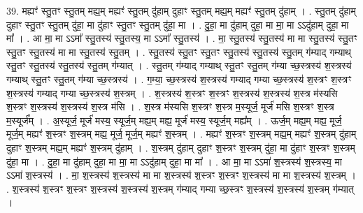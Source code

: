 \documentclass[17pt]{extarticle}
\begin{document}
39. मह्यꣳ॑ स्तु॒तꣳ स्तु॒तम् मह्य॒म् मह्यꣳ॑ स्तु॒तम् दु॑हाम् दुहाꣳ स्तु॒तम् मह्य॒म् मह्यꣳ॑ स्तु॒तम् दु॑हाम् । . स्तु॒तम् दु॑हाम् दुहाꣳ स्तु॒तꣳ स्तु॒तम् दु॑हा॒ मा दु॑हाꣳ स्तु॒तꣳ स्तु॒तम् दु॑हा॒ मा । . दु॒हा॒ मा दु॑हाम् दुहा॒ मा मा॒ मा ऽऽदु॑हाम् दुहा॒ मा मा᳚ । . आ मा॒ मा ऽऽमा᳚ स्तु॒तस्य॑ स्तु॒तस्य॒ मा ऽऽमा᳚ स्तु॒तस्य॑ । . मा॒ स्तु॒तस्य॑ स्तु॒तस्य॑ मा मा स्तु॒तस्य॑ स्तु॒तꣳ स्तु॒तꣳ स्तु॒तस्य॑ मा मा स्तु॒तस्य॑ स्तु॒तम् । . स्तु॒तस्य॑ स्तु॒तꣳ स्तु॒तꣳ स्तु॒तस्य॑ स्तु॒तस्य॑ स्तु॒तम् ग॑म्याद् गम्याथ् स्तु॒तꣳ स्तु॒तस्य॑ स्तु॒तस्य॑ स्तु॒तम् ग॑म्यात् । . स्तु॒तम् ग॑म्याद् गम्याथ् स्तु॒तꣳ स्तु॒तम् ग॑म्या च्छ॒स्त्रस्य॑ श॒स्त्रस्य॑ गम्याथ् स्तु॒तꣳ स्तु॒तम् ग॑म्या च्छ॒स्त्रस्य॑ । . ग॒म्या॒ च्छ॒स्त्रस्य॑ श॒स्त्रस्य॑ गम्याद् गम्या च्छ॒स्त्रस्य॑ श॒स्त्रꣳ श॒स्त्रꣳ श॒स्त्रस्य॑ गम्याद् गम्या च्छ॒स्त्रस्य॑ श॒स्त्रम् । . श॒स्त्रस्य॑ श॒स्त्रꣳ श॒स्त्रꣳ श॒स्त्रस्य॑ श॒स्त्रस्य॑ श॒स्त्र म॑स्यसि श॒स्त्रꣳ श॒स्त्रस्य॑ श॒स्त्रस्य॑ श॒स्त्र म॑सि । . श॒स्त्र म॑स्यसि श॒स्त्रꣳ श॒स्त्र म॒स्यूर्ज॒ मूर्ज॑ मसि श॒स्त्रꣳ श॒स्त्र म॒स्यूर्ज᳚म् । . अ॒स्यूर्ज॒ मूर्ज॑ मस्य॒ स्यूर्ज॒म् मह्य॒म् मह्य॒ मूर्ज॑ मस्य॒ स्यूर्ज॒म् मह्य᳚म् । . ऊर्ज॒म् मह्य॒म् मह्य॒ मूर्ज॒ मूर्ज॒म् मह्यꣳ॑ श॒स्त्रꣳ श॒स्त्रम् मह्य॒ मूर्ज॒ मूर्ज॒म् मह्यꣳ॑ श॒स्त्रम् । . मह्यꣳ॑ श॒स्त्रꣳ श॒स्त्रम् मह्य॒म् मह्यꣳ॑ श॒स्त्रम् दु॑हाम् दुहाꣳ श॒स्त्रम् मह्य॒म् मह्यꣳ॑ श॒स्त्रम् दु॑हाम् । . श॒स्त्रम् दु॑हाम् दुहाꣳ श॒स्त्रꣳ श॒स्त्रम् दु॑हा॒ मा दु॑हाꣳ श॒स्त्रꣳ श॒स्त्रम् दु॑हा॒ मा । . दु॒हा॒ मा दु॑हाम् दुहा॒ मा मा॒ मा ऽऽदु॑हाम् दुहा॒ मा मा᳚ । . आ मा॒ मा ऽऽमा॑ श॒स्त्रस्य॑ श॒स्त्रस्य॒ मा ऽऽमा॑ श॒स्त्रस्य॑ । . मा॒ श॒स्त्रस्य॑ श॒स्त्रस्य॑ मा मा श॒स्त्रस्य॑ श॒स्त्रꣳ श॒स्त्रꣳ श॒स्त्रस्य॑ मा मा श॒स्त्रस्य॑ श॒स्त्रम् । . श॒स्त्रस्य॑ श॒स्त्रꣳ श॒स्त्रꣳ श॒स्त्रस्य॑ श॒स्त्रस्य॑ श॒स्त्रम् ग॑म्याद् गम्या च्छ॒स्त्रꣳ श॒स्त्रस्य॑ श॒स्त्रस्य॑ श॒स्त्रम् ग॑म्यात् । \newline
\end{document}
